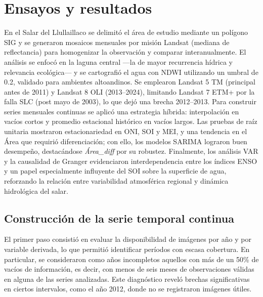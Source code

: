 
\chapter{Ensayos y resultados} %

\label{Chapter4} %
En el Salar del Llullaillaco se delimitó el área de estudio mediante un polígono SIG y se generaron mosaicos mensuales por misión Landsat (mediana de reflectancia) para homogenizar la observación y comparar interanualmente. El análisis se enfocó en la laguna central —la de mayor recurrencia hídrica y relevancia ecológica— y se cartografió el agua con NDWI utilizando un umbral de 0.2, validado para ambientes altoandinos. Se emplearon Landsat 5 TM (principal antes de 2011) y Landsat 8 OLI (2013–2024), limitando Landsat 7 ETM+ por la falla SLC (post mayo de 2003), lo que dejó una brecha 2012–2013. Para construir series mensuales continuas se aplicó una estrategia híbrida: interpolación en vacíos cortos y promedio estacional histórico en vacíos largos. Las pruebas de raíz unitaria mostraron estacionariedad en ONI, SOI y MEI, y una tendencia en el Área que requirió diferenciación; con ello, los modelos SARIMA lograron buen desempeño, destacándose \textit{Área\_diff} por su robustez. Finalmente, los análisis VAR y la causalidad de Granger evidenciaron interdependencia entre los índices ENSO y un papel especialmente influyente del SOI sobre la superficie de agua, reforzando la relación entre variabilidad atmosférica regional y dinámica hidrológica del salar.



\section{Construcción de la serie temporal continua}

El primer paso consistió en evaluar la disponibilidad de imágenes por año y por variable 
derivada, lo que permitió identificar períodos con escasa cobertura. En particular, se 
consideraron como años incompletos aquellos con más de un 50\% de vacíos de información, 
es decir, con menos de seis meses de observaciones válidas en alguna de las series 
analizadas. Este diagnóstico reveló brechas significativas en ciertos intervalos, como 
el año 2012, donde no se registraron imágenes útiles.

